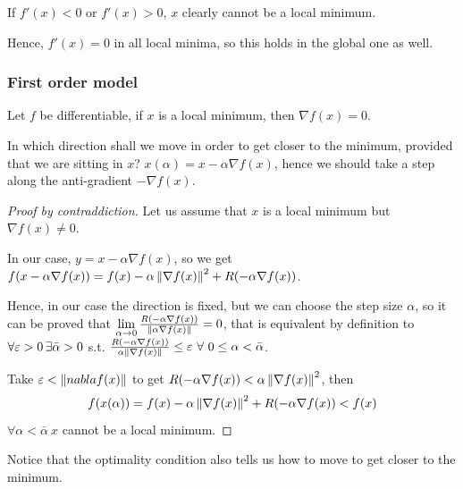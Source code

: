 \documentclass[computationalMathematics.tex]{subfiles}
\begin{document}
If $f'(x) < 0$ or $f'(x) > 0$, $x$ clearly cannot be a local minimum.
 
Hence, $f'(x) = 0$ in all local minima, so this holds in the global one as well.

\subsubsection{First order model}

\begin{proposition}
Let $f$ be differentiable, if $x$ is a local minimum, then $\nabla f(x) = 0$.
\end{proposition}

In which direction shall we move in order to get closer to the minimum, provided that we are sitting in $x$?
$x(\alpha) = x - \alpha \nabla f(x)$, hence we should take a step along the anti-gradient $- \nabla f(x)$.

\begin{proof}[Proof by contraddiction]
  Let us assume that $x$ is a local minimum but $\nabla f(x) \neq 0$.
  
  In our case, $y = x -\alpha \nabla f(x)$, so we get $f(x - \alpha \nabla f(x)) = f(x) - \alpha \left\lVert\nabla f(x)\right\rVert^2 + R(- \alpha \nabla f(x))$.

Hence, in our case the direction is fixed, but we can choose the step size $\alpha$, so it can be proved that $\lim\limits_{\alpha \to 0} \frac{R(- \alpha \nabla f(x))}{\left\lVert\alpha \nabla f(x)\right\rVert} = 0$, that is equivalent by definition to $\forall \varepsilon > 0 \, \exists \bar{\alpha} > 0$ s.t. $\frac{R(- \alpha \nabla f(x))}{\alpha \left\lVert\nabla f(x)\right\rVert} \leq \varepsilon~\forall ~ 0 \leq \alpha < \bar{\alpha}$.

  Take $\varepsilon < \left\lVert nabla f(x)\right\rVert$ to get  $R(- \alpha \nabla f(x)) < \alpha \left\lVert\nabla f(x)\right\rVert^2$, then 
\[
  f(x(\alpha)) = f(x) - \alpha \left\lVert\nabla f(x)\right\rVert^2 + R(- \alpha \nabla f(x)) < f(x)
\]
$\forall \alpha < \bar{\alpha}~x$ cannot be a local minimum.
\end{proof}

Notice that the optimality condition also tells us how to move to get closer to the minimum.
\end{document}
